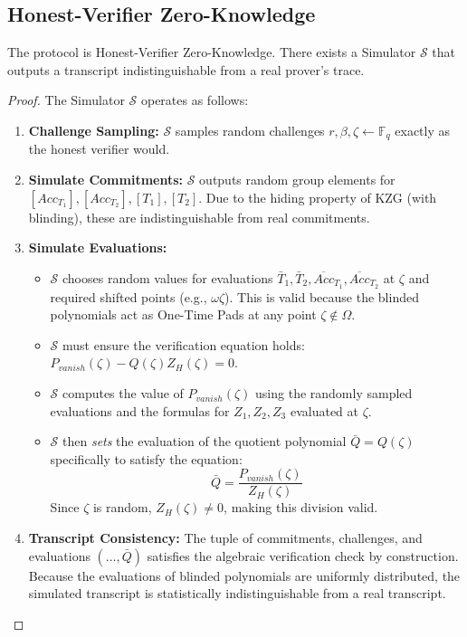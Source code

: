 \documentclass{llncs}
\begin{document}
\subsection{Honest-Verifier Zero-Knowledge}

\begin{theorem}[HVZK]
    The protocol is Honest-Verifier Zero-Knowledge. There exists a Simulator $\mathcal{S}$ that outputs a transcript indistinguishable from a real prover's trace.
\end{theorem}

\begin{proof}
   The Simulator $\mathcal{S}$ operates as follows:

\begin{enumerate}
    \item \textbf{Challenge Sampling:} $\mathcal{S}$ samples random challenges $r, \beta, \zeta \leftarrow \mathbb{F}_q$ exactly as the honest verifier would.
    
    \item \textbf{Simulate Commitments:} $\mathcal{S}$ outputs random group elements for $[Acc_{T_1}], [Acc_{T_2}], [T_1], [T_2]$. Due to the hiding property of KZG (with blinding), these are indistinguishable from real commitments.
    
    \item \textbf{Simulate Evaluations:}
    \begin{itemize}
        \item $\mathcal{S}$ chooses random values for evaluations $\bar{T}_1, \bar{T}_2, \overline{Acc}_{T_1}, \overline{Acc}_{T_2}$ at $\zeta$ and required shifted points (e.g., $\omega\zeta$). This is valid because the blinded polynomials act as One-Time Pads at any point $\zeta \notin \Omega$.
        
        \item $\mathcal{S}$ must ensure the verification equation holds: $P_{vanish}(\zeta) - Q(\zeta)Z_H(\zeta) = 0$.
        
        \item $\mathcal{S}$ computes the value of $P_{vanish}(\zeta)$ using the randomly sampled evaluations and the formulas for $Z_1, Z_2, Z_3$ evaluated at $\zeta$.
        
        \item $\mathcal{S}$ then \textit{sets} the evaluation of the quotient polynomial $\bar{Q} = Q(\zeta)$ specifically to satisfy the equation:
        \[
        \bar{Q} = \frac{P_{vanish}(\zeta)}{Z_H(\zeta)}
        \]
        Since $\zeta$ is random, $Z_H(\zeta) \neq 0$, making this division valid.
    \end{itemize}
    
    \item \textbf{Transcript Consistency:} The tuple of commitments, challenges, and evaluations $(\dots, \bar{Q})$ satisfies the algebraic verification check by construction. Because the evaluations of blinded polynomials are uniformly distributed, the simulated transcript is statistically indistinguishable from a real transcript. 
\end{enumerate}
\end{proof}
\end{document}

